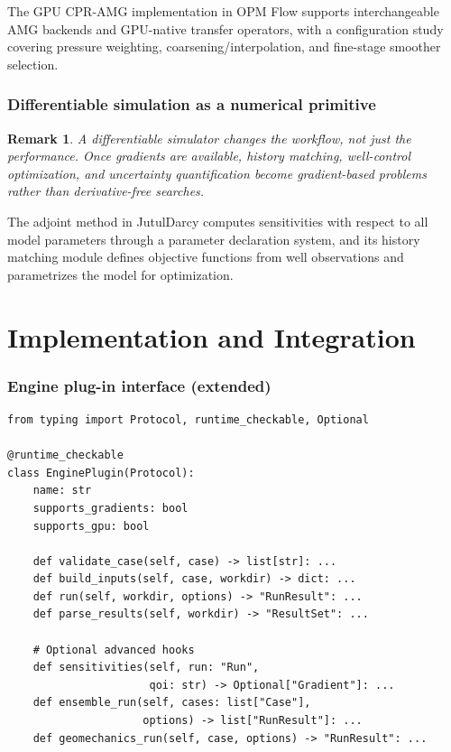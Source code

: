 \documentclass[10pt,a4paper]{article}
\newtheorem{remark}{Remark}[section]
\begin{document}
The GPU CPR-AMG implementation in OPM Flow supports interchangeable AMG
backends and GPU-native transfer operators, with a configuration study
covering pressure weighting, coarsening/interpolation, and fine-stage smoother
selection.

\section{Differentiable simulation as a numerical primitive}

\begin{remark}
A differentiable simulator changes the \emph{workflow}, not just the
performance. Once gradients are available, history matching, well-control
optimization, and uncertainty quantification become gradient-based problems
rather than derivative-free searches.
\end{remark}

The adjoint method in JutulDarcy computes sensitivities with respect to all
model parameters through a parameter declaration system, and its history
matching module defines objective functions from well observations and
parametrizes the model for optimization.

\part{Implementation and Integration}

\section{Engine plug-in interface (extended)}

\begin{lstlisting}[caption={Extended EnginePlugin contract with gradient and UQ hooks.}]
from typing import Protocol, runtime_checkable, Optional

@runtime_checkable
class EnginePlugin(Protocol):
    name: str
    supports_gradients: bool
    supports_gpu: bool

    def validate_case(self, case) -> list[str]: ...
    def build_inputs(self, case, workdir) -> dict: ...
    def run(self, workdir, options) -> "RunResult": ...
    def parse_results(self, workdir) -> "ResultSet": ...

    # Optional advanced hooks
    def sensitivities(self, run: "Run",
                      qoi: str) -> Optional["Gradient"]: ...
    def ensemble_run(self, cases: list["Case"],
                     options) -> list["RunResult"]: ...
    def geomechanics_run(self, case, options) -> "RunResult": ...
\end{lstlisting}
\end{document}
